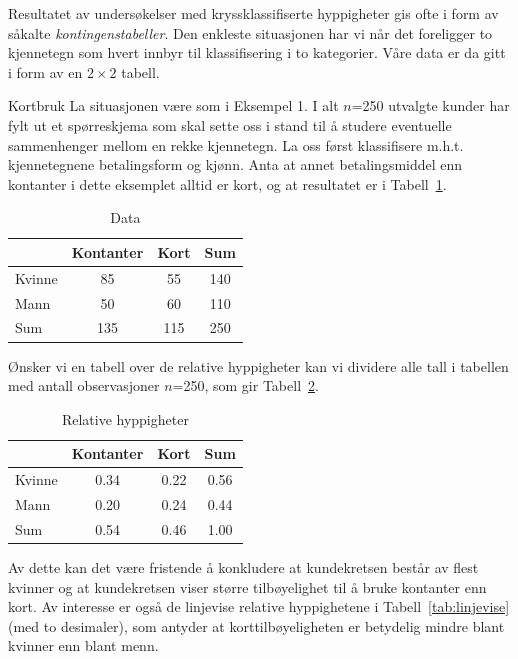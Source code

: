 Resultatet av undersøkelser med kryssklassifiserte hyppigheter
gis ofte i form av såkalte  {\em kontingenstabeller}.
Den enkleste situasjonen har vi når det foreligger to kjennetegn 
som hvert innbyr til klassifisering i to kategorier.  Våre data er da
gitt i form av en $2\times 2$ tabell.\\

\begin{eksempel}{Kortbruk}
La situasjonen være som i Eksempel 1.  I alt $n$=250 utvalgte kunder
har fylt ut et spørreskjema som skal sette oss i stand til å
studere eventuelle sammenhenger mellom en rekke kjennetegn.  La oss
først klassifisere m.h.t. kjennetegnene betalingsform og kjønn.
Anta at annet betalingsmiddel enn kontanter i dette eksemplet alltid
er kort, og at resultatet er i Tabell~\ref{tab:data}.

\begin{table}[h]  \centering 
\begin{tabular}{l|cc|c}
       & Kontanter & Kort & Sum  \\ \hline
Kvinne &    85     &  55  & 140   \\
Mann   &    50     &  60  & 110   \\ \hline
Sum    &   135     & 115  & 250   \\ \hline
\end{tabular}
\caption{Data}
\label{tab:data} %
\end{table}

\noindent Ønsker vi en tabell over de relative hyppigheter kan vi dividere
alle tall i tabellen med antall observasjoner $n$=250, som gir Tabell~\ref{tab:rel_hyppigheter}.

\begin{table} \centering
\begin{tabular}{l|cc|c}
       & Kontanter & Kort & Sum  \\ \hline
Kvinne &    0.34   & 0.22 & 0.56 \\ 
Mann   &    0.20   & 0.24 & 0.44 \\ \hline
Sum    &    0.54   & 0.46 & 1.00 \\ \hline
\end{tabular}
\caption{Relative hyppigheter}
\label{tab:rel_hyppigheter} %
\end{table}

\noindent Av dette kan det være fristende å konkludere at kundekretsen 
består av flest kvinner og at kundekretsen viser større 
tilbøyelighet til å bruke kontanter enn kort.  Av interesse er
også de linjevise relative hyppighetene i Tabell~\ref{tab:linjevise} (med to desimaler),
som antyder at korttilbøyeligheten er betydelig mindre
blant kvinner enn blant menn.
\end{eksempel}

